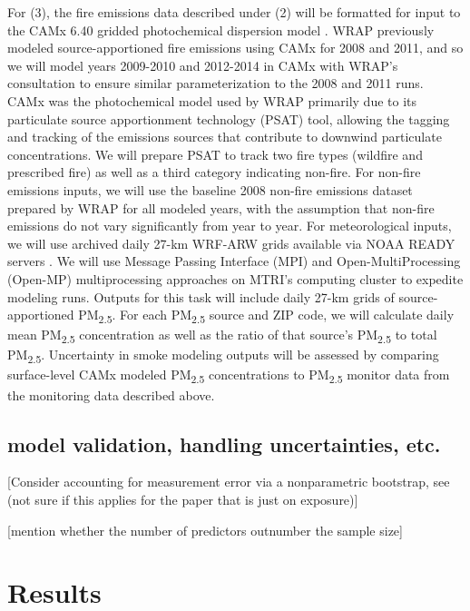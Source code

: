 \documentclass[authoryear]{elsarticle}
\begin{document}
For (3), the fire emissions data described under (2) will be formatted for input to the CAMx 6.40 gridded photochemical dispersion model \citep{CAMx2017}. WRAP previously modeled source-apportioned fire emissions using CAMx for 2008 and 2011, and so we will model years 2009-2010 and 2012-2014 in CAMx with WRAP’s consultation to ensure similar parameterization to the 2008 and 2011 runs. CAMx was the photochemical model used by WRAP primarily due to its particulate source apportionment technology (PSAT) tool, allowing the tagging and tracking of the emissions sources that contribute to downwind particulate concentrations. We will prepare PSAT to track two fire types (wildfire and prescribed fire) as well as a third category indicating non-fire. For non-fire emissions inputs, we will use the baseline 2008 non-fire emissions dataset prepared by WRAP for all modeled years, with the assumption that non-fire emissions do not vary significantly from year to year. For meteorological inputs, we will use archived daily 27-km WRF-ARW grids available via NOAA READY servers \citep{Wang2007,Rolph2017}. We will use Message Passing Interface (MPI) and Open-MultiProcessing (Open-MP) multiprocessing approaches on MTRI's computing cluster to expedite modeling runs. Outputs for this task will include daily 27-km grids of source-apportioned PM\textsubscript{2.5}. For each PM\textsubscript{2.5} source and ZIP code, we will calculate daily mean PM\textsubscript{2.5} concentration as well as the ratio of that source’s PM\textsubscript{2.5} to total PM\textsubscript{2.5}. Uncertainty in smoke modeling outputs will be assessed by comparing surface-level CAMx modeled PM\textsubscript{2.5} concentrations to PM\textsubscript{2.5} monitor data from the monitoring data described above.

\subsection{model validation, handling uncertainties, etc.} %

[Consider accounting for measurement error via a nonparametric bootstrap, see \cite{Keller2017} (not sure if this applies for the paper that is just on exposure)]

[mention whether the number of predictors outnumber the sample size]

\section{Results}
\end{document}
